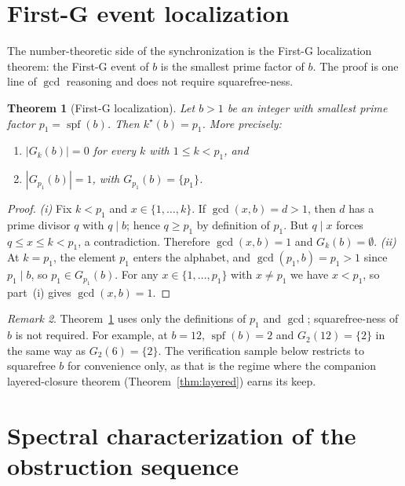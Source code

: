 \documentclass[11pt,reqno]{amsart}
\theoremstyle{plain}
\newtheorem{theorem}{Theorem}[section]
\theoremstyle{definition}
\theoremstyle{remark}
\newtheorem{remark}[theorem]{Remark}
\DeclareMathOperator{\spf}{spf}
\begin{document}
\section{First-G event localization}\label{sec:firstg}

The number-theoretic side of the synchronization is the First-G
localization theorem: the First-G event of $b$ is the smallest prime
factor of $b$. The proof is one line of $\gcd$ reasoning and does not
require squarefree-ness.

\begin{theorem}[First-G localization]\label{thm:firstg}
Let $b > 1$ be an integer with smallest prime factor $p_{1} = \spf(b)$.
Then $k^{\star}(b) = p_{1}$. More precisely:
\begin{enumerate}[label={\upshape(\roman*)}]
\item $|G_{k}(b)| = 0$ for every $k$ with $1 \le k < p_{1}$, and
\item $|G_{p_{1}}(b)| = 1$, with $G_{p_{1}}(b) = \{p_{1}\}$.
\end{enumerate}
\end{theorem}

\begin{proof}
\emph{(i)} Fix $k < p_{1}$ and $x \in \{1, \dots, k\}$. If
$\gcd(x, b) = d > 1$, then $d$ has a prime divisor $q$ with $q \mid b$;
hence $q \ge p_{1}$ by definition of $p_{1}$. But $q \mid x$ forces
$q \le x \le k < p_{1}$, a contradiction. Therefore $\gcd(x, b) = 1$
and $G_{k}(b) = \emptyset$.
\emph{(ii)} At $k = p_{1}$, the element $p_{1}$ enters the alphabet,
and $\gcd(p_{1}, b) = p_{1} > 1$ since $p_{1} \mid b$, so
$p_{1} \in G_{p_{1}}(b)$. For any $x \in \{1, \dots, p_{1}\}$ with
$x \ne p_{1}$ we have $x < p_{1}$, so part~(i) gives $\gcd(x, b) = 1$.
\end{proof}

\begin{remark}\label{rem:nonsqfree}
Theorem~\ref{thm:firstg} uses only the definitions of $p_{1}$ and
$\gcd$; squarefree-ness of $b$ is not required. For example, at
$b = 12$, $\spf(b) = 2$ and $G_{2}(12) = \{2\}$ in the same way as
$G_{2}(6) = \{2\}$. The verification sample below restricts to
squarefree $b$ for convenience only, as that is the regime where the
companion layered-closure theorem (Theorem~\ref{thm:layered}) earns
its keep.
\end{remark}

\section{Spectral characterization of the obstruction sequence}\label{sec:spectral}
\end{document}

